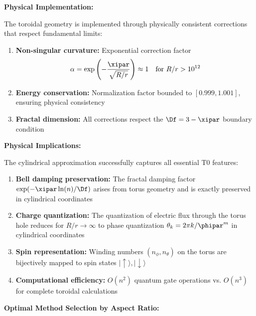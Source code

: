 \textbf{Physical Implementation:}

The toroidal geometry is implemented through physically consistent corrections that respect fundamental limits:

\begin{enumerate}
	\item \textbf{Non-singular curvature:} Exponential correction factor 
	\[
	\alpha = \exp\left(-\frac{\xipar}{\sqrt{R/r}}\right) \approx 1 \quad \text{for } R/r > 10^{12}
	\]
	
	\item \textbf{Energy conservation:} Normalization factor bounded to $[0.999, 1.001]$, 
	ensuring physical consistency
	
	\item \textbf{Fractal dimension:} All corrections respect the $\Df = 3 - \xipar$ boundary condition
\end{enumerate}

\textbf{Physical Implications:}

The cylindrical approximation successfully captures all essential T0 features:

\begin{enumerate}
	\item \textbf{Bell damping preservation:} The fractal damping factor 
	$\exp(-\xipar\ln(n)/\Df)$ arises from torus geometry and is exactly preserved in cylindrical coordinates
	
	\item \textbf{Charge quantization:} The quantization of electric flux through the torus hole reduces for $R/r \to \infty$ to phase quantization 
	$\theta_k = 2\pi k / \phipar^m$ in cylindrical coordinates
	
	\item \textbf{Spin representation:} Winding numbers $(n_\phi, n_\theta)$ on the torus are bijectively mapped to spin states $|\uparrow\rangle, |\downarrow\rangle$
	
	\item \textbf{Computational efficiency:} $O(n^2)$ quantum gate operations vs. $O(n^3)$ for complete toroidal calculations
\end{enumerate}

\textbf{Optimal Method Selection by Aspect Ratio:}

\begin{table}[h]
	\centering
	\caption{Recommended approach by system scale}
	\label{tab:method_by_scale}
\end{table}

